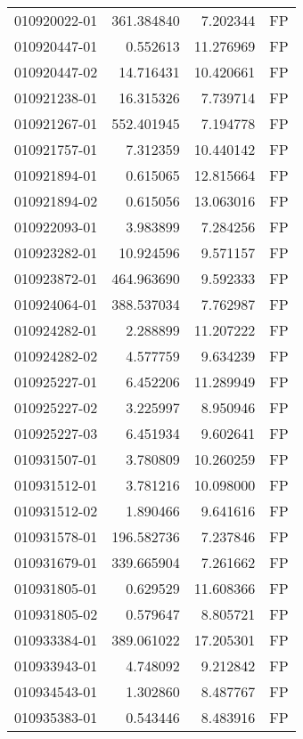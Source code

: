 \begin{tabular}{lrrl}
010920022-01 &  361.384840 &       7.202344 &   FP \\
010920447-01 &    0.552613 &      11.276969 &   FP \\
010920447-02 &   14.716431 &      10.420661 &   FP \\
010921238-01 &   16.315326 &       7.739714 &   FP \\
010921267-01 &  552.401945 &       7.194778 &   FP \\
010921757-01 &    7.312359 &      10.440142 &   FP \\
010921894-01 &    0.615065 &      12.815664 &   FP \\
010921894-02 &    0.615056 &      13.063016 &   FP \\
010922093-01 &    3.983899 &       7.284256 &   FP \\
010923282-01 &   10.924596 &       9.571157 &   FP \\
010923872-01 &  464.963690 &       9.592333 &   FP \\
010924064-01 &  388.537034 &       7.762987 &   FP \\
010924282-01 &    2.288899 &      11.207222 &   FP \\
010924282-02 &    4.577759 &       9.634239 &   FP \\
010925227-01 &    6.452206 &      11.289949 &   FP \\
010925227-02 &    3.225997 &       8.950946 &   FP \\
010925227-03 &    6.451934 &       9.602641 &   FP \\
010931507-01 &    3.780809 &      10.260259 &   FP \\
010931512-01 &    3.781216 &      10.098000 &   FP \\
010931512-02 &    1.890466 &       9.641616 &   FP \\
010931578-01 &  196.582736 &       7.237846 &   FP \\
010931679-01 &  339.665904 &       7.261662 &   FP \\
010931805-01 &    0.629529 &      11.608366 &   FP \\
010931805-02 &    0.579647 &       8.805721 &   FP \\
010933384-01 &  389.061022 &      17.205301 &   FP \\
010933943-01 &    4.748092 &       9.212842 &   FP \\
010934543-01 &    1.302860 &       8.487767 &   FP \\
010935383-01 &    0.543446 &       8.483916 &   FP \\

\end{tabular}

